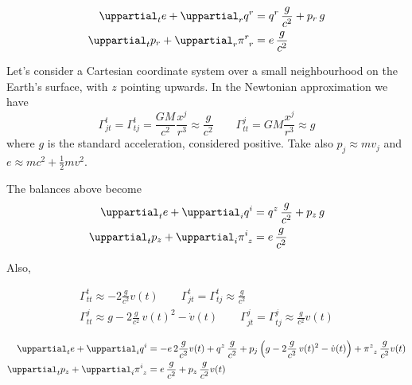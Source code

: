\documentclass[a4paper,12pt,%
onecolumn,oneside,article,%
british%
]{memoir}
\theoremstyle{remark}
\theoremstyle{innote}
\newcommand*{\de}{\mathop{}\!\uppartial}%
\renewcommand*{\|}[1][]{\nonscript\:#1\vert\nonscript\:\mathopen{}}
\newcommand*{\sect}{\S}%
\renewcommand*{\i}{{}\indices}
\begin{document}
\begin{align}
  \label{eq:div_e_r_S}
  \de_{t}e + \de_{r}q^{r} &=
  q^{r}\, \frac{g}{c^{2}}
  +p_{r}\, g
  \\
  \label{eq:div_p_r_S}
  \de_{t}p_{r} +  \de_{r}\pi\i{^{r}_{r}} &=
  e\, \frac{g}{c^{2}}
\end{align}





Let's consider a Cartesian coordinate system over a small neighbourhood on the Earth's surface, with $z$ pointing upwards. In the Newtonian approximation we have \autocites[\sect\,5.2.3]{poissonetal2014}
\begin{equation}
  \label{eq:christof_newt}
  \varGamma^{t}_{jt}=\varGamma^{t}_{tj} =
    \frac{GM}{c^{2}}\frac{x^{j}}{r^{3}} \approx \frac{g}{c^{2}}
  \qquad\varGamma^{j}_{tt} = GM\frac{x^{j}}{r^{3}} \approx g
\end{equation}
where $g$ is the standard acceleration, considered positive. Take also $p_{j} \approx m v_{j}$ and $e\approx m c^{2} + \frac{1}{2}mv^{2}$.



The balances above become
\begin{align}
  \label{eq:div_e_appr}
  \de_{t}e + \de_{i}q^{i} &=
  q^{z}\, \frac{g}{c^{2}}
  +p_{z}\, g
  \\
  \label{eq:div_p_appr}
  \de_{t}p_{z} +  \de_{i}\pi\i{^{i}_{z}} &=
  e\,\frac{g}{c^{2}}
\end{align}

Also,

\begin{equation}
  \label{eq:christof_body}
  \begin{gathered}
    \varGamma^{t}_{tt} \approx
    -2\frac{g}{c^{2}} v(t)
    \qquad
    \varGamma^{t}_{jt}=\varGamma^{t}_{tj}
    \approx \frac{g}{c^{2}}
    \\
    \varGamma^{j}_{tt} \approx
    g - 2\frac{g}{c^{2}}\,v(t)^{2} - \dot{v}(t)
    \qquad
    \varGamma^{j}_{jt} = \varGamma^{j}_{tj} \approx
    \frac{g}{c^{2}} v(t)
  \end{gathered}
\end{equation}

\begin{align}
  \label{eq:div_e_Newt}
  \de_{t}e + \de_{i}q^{i} &=
  -e\,2\frac{g}{c^{2}} v(t)
  +q^{z}\, \frac{g}{c^{2}}
  +p_{j}\, \Bigl(g - 2\frac{g}{c^{2}}\,v(t)^{2} - \dot{v}(t)\Bigr)
  +\pi\i{^{z}_{z}}\, \frac{g}{c^{2}} v(t)
  \\
  \label{eq:div_p_Newt}
  \de_{t}p_{z} +  \de_{i}\pi\i{^{i}_{z}} &=
  e\, \frac{g}{c^{2}}
  +p_{z}\,\frac{g}{c^{2}} v(t)
\end{align}
\end{document}
